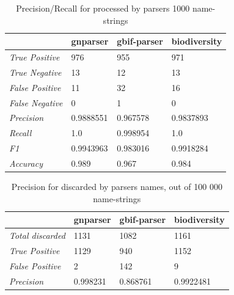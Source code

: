 \documentclass{bmcart}
\begin{document}
\begin{table}[htb]
  \begin{center}
    \caption{Precision/Recall for processed by parsers 1000
    name-strings}\label{table:precision}
    \resizebox{10cm}{!} {
    \begin{tabular}{|l|*{3}{l}|}
      \hline
                             & gnparser & gbif-parser & biodiversity \\
      \hline
      \textit{True Positive} & 976      & 955         & 971          \\
      \textit{True Negative} & 13       & 12          & 13           \\
      \textit{False Positive}& 11       & 32          & 16           \\
      \textit{False Negative}& 0        & 1           & 0            \\
      \textit{Precision}     & 0.9888551& 0.967578    & 0.9837893    \\
      \textit{Recall}        & 1.0      & 0.998954    & 1.0          \\
      \textit{F1}            & 0.9943963& 0.983016    & 0.9918284    \\
      \textit{Accuracy}      & 0.989    & 0.967       & 0.984        \\
      \hline
    \end{tabular}
    }
  \end{center}
\end{table}

\begin{table}[htb]
  \begin{center}
    \caption{Precision for discarded by parsers names, out of 100 000
    name-strings}\label{table:unparsed}
    \resizebox{10cm}{!} {
    \begin{tabular}{| l | *{3}{l} |}
      \hline
                              & gnparser & gbif-parser & biodiversity \\
      \hline
      \textit{Total discarded}& 1131     & 1082        & 1161         \\
      \textit{True Positive}  & 1129     & 940         & 1152         \\
      \textit{False Positive} & 2        & 142         & 9            \\
      \textit{Precision}      & 0.998231 & 0.868761    & 0.9922481    \\
      \hline
    \end{tabular}
  }
  \end{center}
\end{table}
\end{document}
